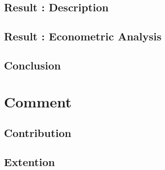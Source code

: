 \documentclass{jsarticle}[12pt]
\begin{document}
  \subsection{Result : Description}
  
  
  
  \subsection{Result : Econometric Analysis}
  
  
  
  \subsection{Conclusion}
  
  
 
 \section{Comment}
 
 
 
  \subsection{Contribution}
  
  
  
  \subsection{Extention}
  
  
\end{document}
